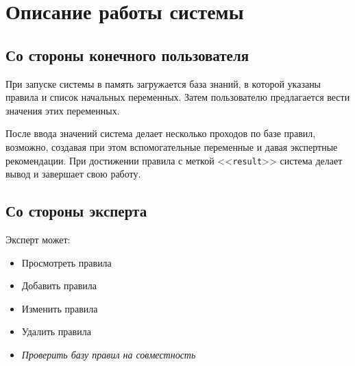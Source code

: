 \section{Описание работы системы}

\subsection{Со стороны конечного пользователя}

При запуске системы в память загружается база знаний, в которой указаны правила и список начальных переменных.
Затем пользователю предлагается вести значения этих переменных.

После ввода значений система делает несколько проходов по базе правил, возможно, создавая при этом вспомогательные переменные и давая экспертные рекомендации.
При достижении правила с меткой <<\texttt{result}>> система делает вывод и завершает свою работу.

\subsection{Со стороны эксперта}

Эксперт может:
\begin{itemize}
	\item Просмотреть правила
	\item Добавить    правила
	\item Изменить    правила
	\item Удалить     правила
	\item \textit{Проверить базу правил на совместность} %
\end{itemize}
